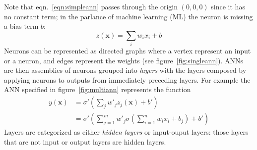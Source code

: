 %
Note that eqn.~\eqref{eqn:simpleann} passes through the origin \((0,0,0)\) since it has no constant term; in the parlance of machine learning (ML) the neuron is missing a bias term \(b\):
\begin{equation}
    z(\mathbf{x}) = \sum_i w_i x_i + b
    \label{eqn:linearregr}
\end{equation}
%
Neurons can be represented as directed graphs where a vertex represent an input or a neuron, and edges represent the weights (see figure~\ref{fig:singleann}).
%
ANNs are then assemblies of neurons grouped into \textit{layers} with the layers composed by applying neurons to outputs from immediately preceding layers.
%
For example the ANN specified in figure~\ref{fig:multiann} represents the function
\begin{equation}
    \begin{split}
        y(\mathbf{x}) &= \sigma' \left( \sum_j w'_j z_j(\mathbf{x}) + b' \right) \\
        &=  \sigma' \left( \sum_{j=1}^m w'_j \sigma\left(\sum_{i=1}^n w_i x_i + b_j\right) + b' \right)
    \end{split}
\end{equation}
%
Layers are categorized as either \textit{hidden layers} or input-ouput layers: those layers that are not input or output layers are hidden layers.

